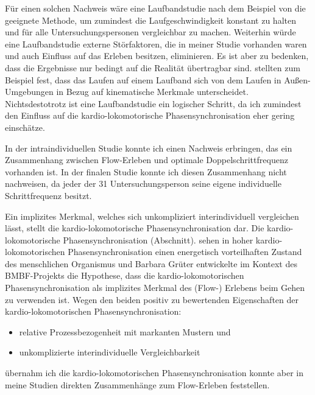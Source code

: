 Für einen solchen Nachweis wäre eine Laufbandstudie nach dem Beispiel von \citet{Reinhardt2006} die geeignete Methode, um zumindest die Laufgeschwindigkeit konstant zu halten und für alle Untersuchungspersonen vergleichbar zu machen. Weiterhin würde eine Laufbandstudie externe Störfaktoren, die in meiner Studie vorhanden waren und auch Einfluss auf das Erleben besitzen, eliminieren. Es ist aber zu bedenken, dass die Ergebnisse nur bedingt auf die Realität übertragbar sind. \citet{Strohrmann2012} stellten zum Beispiel fest, dass das Laufen auf einem Laufband sich von dem Laufen in Außen-Umgebungen in Bezug auf kinematische Merkmale unterscheidet. Nichtsdestotrotz ist eine Laufbandstudie ein logischer Schritt, da ich zumindest den Einfluss auf die kardio-lokomotorische Phasensynchronisation eher gering einschätze. 

In der intraindividuellen Studie konnte ich einen Nachweis erbringen, das ein Zusammenhang zwischen Flow-Erleben und optimale Doppelschrittfrequenz vorhanden ist. In der finalen Studie konnte ich diesen Zusammenhang nicht nachweisen, da jeder der 31 Untersuchungsperson seine eigene individuelle Schrittfrequenz besitzt.  

Ein implizites Merkmal, welches sich unkompliziert interindividuell vergleichen lässt, stellt die kardio-lokomotorische Phasensynchronisation dar. Die kardio-lokomotorische Phasensynchronisation (Abschnitt). \citet[][S.~18]{Niizeki2014} sehen in hoher kardio-lokomotorischen Phasensynchronisation einen energetisch vorteilhaften Zustand des menschlichen Organismus und Barbara Grüter entwickelte im Kontext des \acs{BMBF}-Projekts die Hypothese, dass die kardio-lokomotorischen Phasensynchronisation als implizites Merkmal des (Flow-) Erlebens beim Gehen zu verwenden ist. Wegen den beiden positiv zu bewertenden Eigenschaften der kardio-lokomotorischen Phasensynchronisation: 
\begin{itemize}
	
	\item relative Prozessbezogenheit mit markanten Mustern und
	
	\item unkomplizierte interindividuelle Vergleichbarkeit
\end{itemize}

übernahm ich die kardio-lokomotorischen Phasensynchronisation konnte aber in meine Studien direkten Zusammenhänge zum Flow-Erleben feststellen. 

